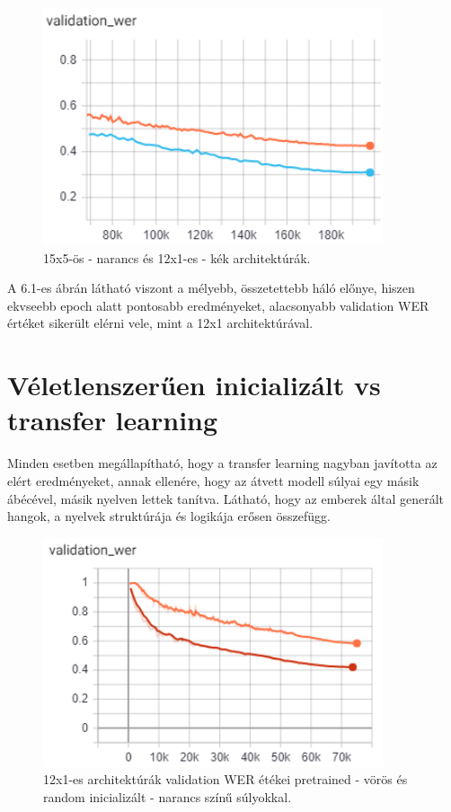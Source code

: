 \begin{figure}[!ht]
\centering
\includegraphics[width=100mm, keepaspectratio]{figures/architecture_12x1_vs_15x5.png}
\caption{15x5-ös - narancs és 12x1-es - kék architektúrák.}
\end{figure}

A 6.1-es ábrán látható viszont a mélyebb, összetettebb háló előnye, hiszen ekvseebb epoch alatt pontosabb eredményeket, alacsonyabb validation WER értéket sikerült elérni vele, mint a 12x1 architektúrával.

\section{Véletlenszerűen inicializált vs transfer learning}

Minden esetben megállapítható, hogy a transfer learning nagyban javította az elért eredményeket, annak ellenére, hogy az átvett modell súlyai egy másik ábécével, másik nyelven lettek tanítva.  Látható, hogy az emberek által generált hangok, a nyelvek struktúrája és logikája erősen összefügg.

\begin{figure}[!ht]
\centering
\includegraphics[width=100mm, keepaspectratio]{figures/12x1_pretrained_vs_random.png}
\caption{12x1-es architektúrák validation WER étékei pretrained - vörös és random inicializált - narancs színű súlyokkal.}
\end{figure}

